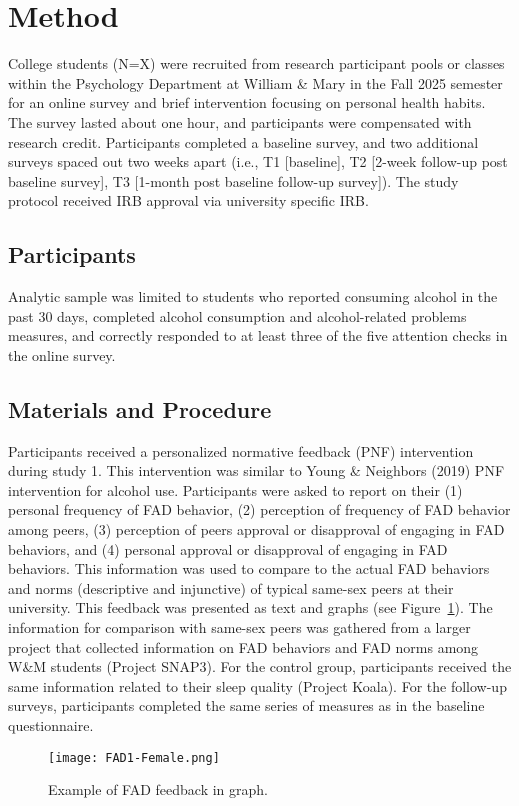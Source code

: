 \section{Method}

College students (N=X) were recruited from research participant pools or classes within the Psychology Department at William \& Mary in the Fall 2025 semester for an online survey and brief intervention focusing on personal health habits. The survey lasted about one hour, and participants were compensated with research credit. Participants completed a baseline survey, and two additional surveys spaced out two weeks apart (i.e., T1 [baseline], T2 [2-week follow-up post baseline survey], T3 [1-month post baseline follow-up survey]). The study protocol received IRB approval via university specific IRB.

\subsection{Participants}

Analytic sample was limited to students who reported consuming alcohol in the past 30 days, completed alcohol consumption and alcohol-related problems measures, and correctly responded to at least three of the five attention checks in the online survey.

\subsection{Materials and Procedure}

Participants received a personalized normative feedback (PNF) intervention during study 1. This intervention was similar to Young \& Neighbors (2019) PNF intervention for alcohol use. Participants were asked to report on their (1) personal frequency of FAD behavior, (2) perception of frequency of FAD behavior among peers, (3) perception of peers approval or disapproval of engaging in FAD behaviors, and (4) personal approval or disapproval of engaging in FAD behaviors. This information was used to compare to the actual FAD behaviors and norms (descriptive and injunctive) of typical same-sex peers at their university. This feedback was presented as text and graphs (see Figure~\ref{fig:gearhead}). The information for comparison with same-sex peers was gathered from a larger project that collected information on FAD behaviors and FAD norms among W\&M students (Project SNAP3). For the control group, participants received the same information related to their sleep quality (Project Koala). For the follow-up surveys, participants completed the same series of measures as in the baseline questionnaire.

\begin{figure}[h!] 
\centering
\texttt{[image: FAD1-Female.png]}
\caption{\label{fig:gearhead}Example of FAD feedback in graph.}
\end{figure}